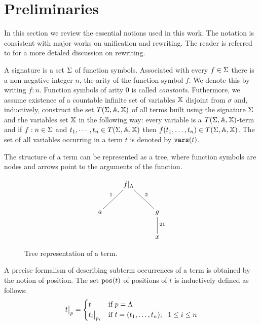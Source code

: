 \section{Preliminaries}
In this section we review the essential notions used in this work. The notation is consistent with major works on unification and rewriting. The reader is referred to \cite{bezem2003term} for a more detaled discussion on rewriting.

A signature is a set $\Sigma$ of function symbols. Associated with every $f \in \Sigma$ there is a non-negative integer $n$, the arity of the function symbol $f$. We denote this by writing $f:n$. Function symbols of arity $0$ is called \textit{constants}. Futhermore, we assume existence of a countable infinite set of variables $\mathbb{X}$ disjoint from $\sigma$ and, inductively, construct the set $T(\Sigma,\mathbb{A},\mathbb{X})$ of all terms built using the signature $\Sigma$ and the variables set $\mathbb{X}$ in the following way: every variable is a $T(\Sigma,\mathbb{A},\mathbb{X})$-term and if $f:n \in \Sigma$ and $t_1, \cdots, t_n \in T(\Sigma,\mathbb{A},\mathbb{X})$ then $f(t_1, \dots, t_n) \in T(\Sigma,\mathbb{A},\mathbb{X})$. The set of all variables occurring in a term $t$ is denoted by $\mathtt{vars}(t)$.

The structure of a term can be represented as a tree, where function symbols are nodes and arrows point to the arguments of the function.
\begin{figure}[!ht]
	\begin{displaymath}
		\xymatrix{
		&f|_\Lambda \ar@{-}^2[dr]\ar@{-}_1[dl]&\\
		a  & & g \ar@{-}^{21}[d] \\
		& &x
		}
	\end{displaymath}
	\caption{Tree representation of a term.}
	\label{figure:tree-representation-of-a-term}
\end{figure}
A precise formalism of describing subterm occurrences of a term is obtained by the notion of position. The set $\mathtt{pos}(t)$ of positions of $t$ is inductively defined as follows:
\begin{displaymath}
    \restr{t}{p} =
	\begin{cases}
		t                & \mbox{if } p = \Lambda                               \\
		\restr{t_i}{p_i} & \mbox{if } t = (t_1,\dots, t_n); \ \ 1 \leq i \leq n
	\end{cases}
\end{displaymath}

